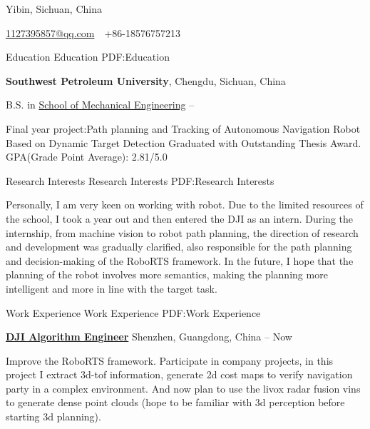 \documentclass[letterpaper,MMMyyyy,nonstopmode]{simpleresumecv}
\newcommand{\CVAuthor}{Xiangyong Wen}
\begin{document}

\Title{\CVAuthor}

\begin{SubTitle}
Yibin, Sichuan, China
\par
\href{mailto:1127395857@qq.com}
{1127395857@qq.com}
\,\SubBulletSymbol\,
+86-18576757213
\,\SubBulletSymbol\,
\end{SubTitle}

\begin{Body}


\Section
{Education}
{Education}
{PDF:Education}

\Entry
{\textbf{Southwest Petroleum University}},
Chengdu, Sichuan, China

\Gap
\BulletItem
B.S. in
\href{http://www.swpu.edu.cn/jdy/}
{School of Mechanical Engineering}
\hfill
{} --
\begin{Detail}
\SubBulletItem
Final year project:Path planning and Tracking of Autonomous Navigation Robot Based on Dynamic Target Detection
\SubBulletItem
Graduated with Outstanding Thesis Award.
\SubBulletItem
GPA(Grade Point Average): 2.81/5.0
\end{Detail}


\Section
{Research Interests}
{Research Interests}
{PDF:Research Interests}

\Entry
\begin{Detail}
Personally, I am very keen on working with robot. Due to the limited resources of the school, 
I took a year out and then entered the DJI as an intern. During the internship, 
from machine vision to robot path planning, the direction of research and development was gradually clarified, 
also responsible for the path planning and decision-making of the RoboRTS framework. 
In the future, I hope that the planning of the robot involves more semantics, making the planning more intelligent and more in line with the target task.
\end{Detail}


\Section
{Work Experience}
{Work Experience}
{PDF:Work Experience}

\Entry
\href{https://www.robomaster.com}
{\textbf{DJI Algorithm Engineer}}
Shenzhen, Guangdong, China
\hfill
{} --
Now
\begin{Detail}
    Improve the RoboRTS framework. Participate in company projects, in this project I extract 3d-tof information, generate 2d cost maps to verify navigation party in a complex environment. 
    And now plan to use the livox radar fusion vins to generate dense point clouds (hope to be familiar with 3d perception before starting 3d planning).
\end{Detail}


\end{Body}
\end{document}
